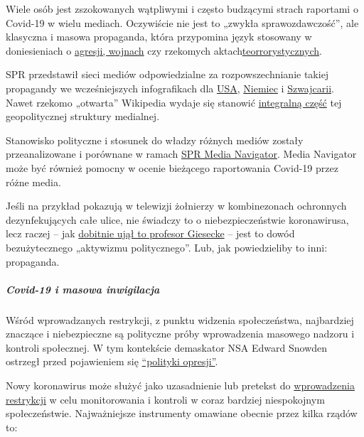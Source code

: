 Wiele osób jest zszokowanych wątpliwymi i często budzącymi strach
raportami o Covid-19 w wielu mediach. Oczywiście nie jest to „zwykła
sprawozdawczość'', ale klasyczna i masowa propaganda, która przypomina
język stosowany w doniesieniach o
\href{https://swprs.org/propaganda-in-the-war-on-yugoslavia/}{agresji,
wojnach} czy rzekomych
aktach\href{https://www.motherjones.com/politics/2013/01/terror-factory-fbi-trevor-aaronson-book/}{teorrorystycznych}.

SPR przedstawił sieci mediów odpowiedzialne za rozpowszechnianie takiej
propagandy we wcześniejszych infografikach dla
\href{https://swprs.org/the-american-empire-and-its-media/}{USA},
\href{https://swprs.org/netzwerk-medien-deutschland/}{Niemiec} i
\href{https://swprs.org/netzwerk-medien-schweiz/}{Szwajcarii}. Nawet
rzekomo „otwarta'' Wikipedia wydaje się stanowić
\href{https://swprs.org/wikipedia-disinformation-operation/}{integralną
część} tej geopolitycznej struktury medialnej.

Stanowisko polityczne i stosunek do władzy różnych mediów zostały
przeanalizowane i porównane w ramach
\href{https://swprs.org/media-navigator/}{SPR Media Navigator}. Media
Navigator może być również pomocny w ocenie bieżącego raportowania
Covid-19 przez różne media.

Jeśli na przykład pokazują w telewizji żołnierzy w kombinezonach
ochronnych dezynfekujących całe ulice, nie świadczy to o
niebezpieczeństwie koronawirusa, lecz raczej -- jak
\href{https://www.addendum.org/coronavirus/interview-johan-giesecke/}{dobitnie
ujął to profesor Giesecke} -- jest to dowód bezużytecznego „aktywizmu
politycznego''. Lub, jak powiedzieliby to inni: propaganda.

\hypertarget{covid-19-i-masowa-inwigilacja}{%
\subparagraph{\texorpdfstring{\textbf{Covid-19 i masowa
inwigilacja}}{Covid-19 i masowa inwigilacja}}\label{covid-19-i-masowa-inwigilacja}}

Wśród wprowadzanych restrykcji, z punktu widzenia społeczeństwa,
najbardziej znaczące i niebezpieczne są polityczne próby wprowadzenia
masowego nadzoru i kontroli społecznej. W tym kontekście demaskator NSA
Edward Snowden ostrzegł przed pojawieniem się
\href{https://www.vice.com/en_us/article/bvge5q/snowden-warns-governments-are-using-coronavirus-to-build-the-architecture-of-oppression}{``polityki
opresji''}.

Nowy koronawirus może służyć jako uzasadnienie lub pretekst do
\href{https://norberthaering.de/die-regenten-der-welt/id2020-ktdi-apple-google/}{wprowadzenia
restrykcji} w celu monitorowania i kontroli w coraz bardziej
niespokojnym społeczeństwie. Najważniejsze instrumenty omawiane obecnie
przez kilka rządów to:

